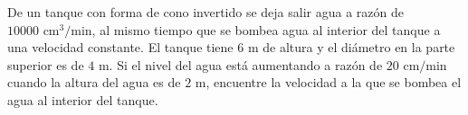 \item De un tanque con forma de cono invertido se deja salir agua a razón de $10000 \text{ cm}^3/\text{min}$, al mismo tiempo que se bombea agua al interior del tanque a una velocidad constante. El tanque tiene $6 \text{ m}$ de altura y el diámetro en la parte superior es de $4 \text{ m}$. Si el nivel del agua está aumentando a razón de $20 \text{ cm/min}$ cuando la altura del agua es de $2 \text{ m}$, encuentre la velocidad a la que se bombea el agua al interior del tanque.

